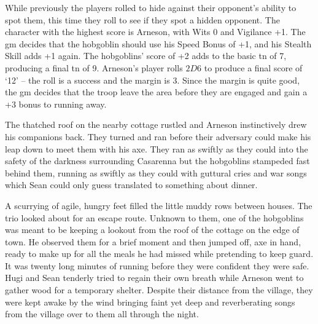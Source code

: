 \begin{exampletext}


  While previously the players rolled to hide against their opponent's ability to spot them, this time they roll to see if they spot a hidden opponent.
  The character with the highest score is Arneson, with Wits 0 and Vigilance +1.
  The \gls{gm} decides that the hobgoblin should use his Speed Bonus of +1, and his Stealth Skill adds +1 again.
  The hobgoblins' score of +2 adds to the basic \gls{tn} of 7, producing a final \gls{tn} of 9.
  Arneson's player rolls $2D6$ to produce a final score of `12' -- the roll is a success and the margin is 3.
  Since the margin is quite good, the \gls{gm} decides that the troop leave the area before they are engaged and gain a +3 bonus to running away.

  The thatched roof on the nearby cottage rustled and Arneson instinctively drew his companions back.
  They turned and ran before their adversary could make his leap down to meet them with his axe.
  They ran as swiftly as they could into the safety of the darkness surrounding Casarenna but the hobgoblins stampeded fast behind them, running as swiftly as they could with guttural cries and war songs which Sean could only guess translated to something about dinner.

  A scurrying of agile, hungry feet filled the little muddy rows between houses.
  The trio looked about for an escape route.
  Unknown to them, one of the hobgoblins was meant to be keeping a lookout from the roof of the cottage on the edge of town.
  He observed them for a brief moment and then jumped off, axe in hand, ready to make up for all the meals he had missed while pretending to keep guard.
  It was twenty long minutes of running before they were confident they were safe.
  Hugi and Sean tenderly tried to regain their own breath while Arneson went to gather wood for a temporary shelter.
  Despite their distance from the village, they were kept awake by the wind bringing faint yet deep and reverberating songs from the village over to them all through the night.

  \end{exampletext}


